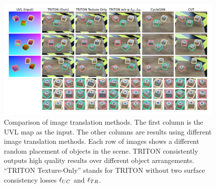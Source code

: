 \documentclass{article}
\begin{document}


\begin{figure}[th]
	\begin{center}
		\includegraphics[width=\textwidth]{../images/frame_inconsistency_diagram.png}
	\end{center}
	\vspace{-7pt}
	\caption{
	    Comparison of image translation methods.
	    The first column is the UVL map as the input.
	    The other columns are results using different image translation methods.
		Each row of images shows a different random placement of objects in the scene.
		TRITON consistently outputs high quality results over different object arrangements. 
		``TRITON Texture-Only'' stands for TRITON without two surface consistency losses $\ell_{UC}$ and $\ell_{TR}$.
		}
		\vspace{-15pt}
		\label{fig:frame_inconsistency_diagram}
	\end{figure}
	
\end{document}
